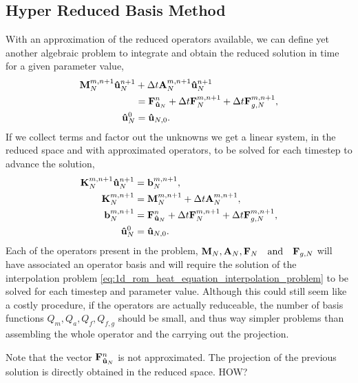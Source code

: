 \documentclass[../main.tex]{subfiles}
\begin{document}
\subsection{Hyper Reduced Basis Method}
With an approximation of the reduced operators available, we can define yet another algebraic problem to integrate and obtain the reduced solution in time for a given parameter value,
\begin{subequations}
    \label{eq:1d_rom_weak_formulation_discrete}
    \begin{align}
        \vb{M}^{m, n+1}_N \vb{\hat{u}}_{N}^{n+1} &+ \Delta t \vb{A}^{m, n+1}_N \vb{\hat{u}}_{N}^{n+1} \\ 
        &= \vb{F}^{n}_{\vb{\hat{u}}_N} + \Delta t \vb{F}_N^{m,n+1} + \Delta t \vb{F}^{m,n+1}_{g, N}, \nonumber \\
        \vb{\hat{u}}_N^{0} &= \vb{\hat{u}}_{N,0}.
    \end{align}
\end{subequations}
If we collect terms and factor out the unknowns we get a linear system, in the reduced space and with approximated operators, to be solved for each timestep to advance the solution,
\begin{subequations}
    \label{eq:1d_rom_linear_system_approximation_timestep}
    \begin{align}
        \vb{K}_N^{m,n+1} \vb{\hat{u}}_N^{n+1} &= \vb{b}_N^{m, n+1}, \\
        \vb{K}_N^{m,n+1} &= \vb{M}_{N}^{m,n+1} + \Delta t \vb{A}_{N}^{m,n+1}, \\
        \vb{b}_N^{m,n+1} &= \vb{F}_{\vb{\hat{u}}_N}^{n} + \Delta t \vb{F}_N^{m,n+1} + \Delta t \vb{F}_{g,N}^{m,n+1}, \\
        \vb{\hat{u}}_N^{0} &= \vb{\hat{u}}_{N,0}.
    \end{align}
\end{subequations}
Each of the operators present in the problem, $\vb{M}_N, \vb{A}_N, \vb{F}_N \qqtext{and} \vb{F}_{g,N}$ will have associated an operator basis and will require the solution of the interpolation problem \eqref{eq:1d_rom_heat_equation_interpolation_problem} to be solved for each timestep and parameter value.
Although this could still seem like a costly procedure, if the operators are actually reduceable, the number of basis functions $Q_m, Q_a, Q_f, Q_{f,g}$ should be small, and thus way simpler problems than assembling the whole operator and the carrying out the projection. 

Note that the vector $\vb{F}_{\vb{\hat{u}}_N}^{n}$ is not approximated.
The projection of the previous solution is directly obtained in the reduced space.
HOW?
\end{document}
